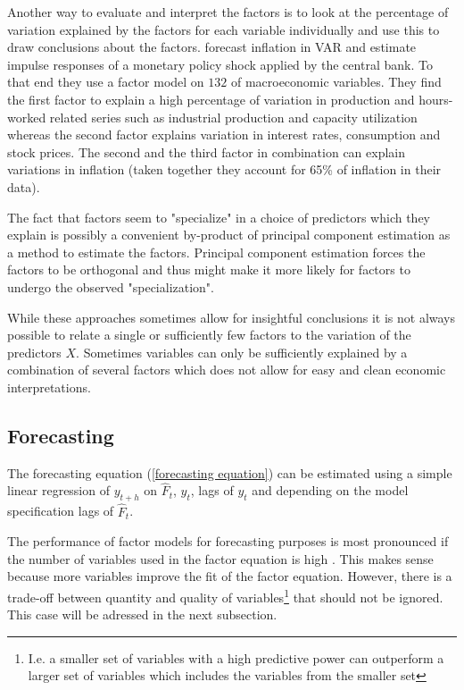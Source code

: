 \documentclass[12pt]{article}
\begin{document}
Another way to evaluate and interpret the factors is to look at the percentage of variation explained by the factors for each variable individually and use this to draw conclusions about the factors. \citet{stock2005implications} forecast inflation in VAR and estimate impulse responses of a monetary policy shock applied by the central bank. To that end they use a factor model on $132$ of macroeconomic variables. They find the first factor to explain a high percentage of variation in production and hours-worked related series such as industrial production and capacity utilization whereas the second factor explains variation in interest rates, consumption and stock prices. The second and the third factor in combination can explain variations in inflation (taken together they account for 65\% of inflation in their data).

The fact that factors seem to "specialize" in a choice of predictors which they explain is possibly a convenient by-product of principal component estimation as a method to estimate the factors. Principal component estimation forces the factors to be orthogonal and thus might make it more likely for factors to undergo the observed "specialization".

While these approaches sometimes allow for insightful conclusions it is not always possible to relate a single or sufficiently few factors to the variation of the predictors $X$. Sometimes variables can only be sufficiently explained by a combination of several factors which does not allow for easy and clean economic interpretations. 

\subsection{Forecasting}
The forecasting equation (\ref{forecasting equation}) can be estimated using a simple linear regression of $y_{t+h}$ on $\hat F_t$, $y_t$, lags of $y_t$ and depending on the model specification lags of $\hat F_t$.

The performance of factor models for forecasting purposes is most pronounced if the number of variables used in the factor equation is high \citep{stock2011dynamic}. This makes sense because more variables improve the fit of the factor equation. However, there is a trade-off between quantity and quality of variables\footnote{I.e. a smaller set of variables with a high predictive power can outperform a larger set of variables which includes the variables from the smaller set} that should not be ignored. This case will be adressed in the next subsection.
\end{document}
